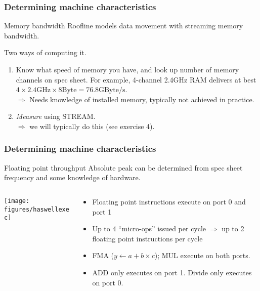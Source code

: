 \documentclass[presentation,aspectratio=43,10pt]{beamer}
\begin{document}
\begin{frame}
  \frametitle{Determining machine characteristics}
  \begin{exampleblock}{Memory bandwidth}
    Roofline models data movement with streaming memory bandwidth.

    Two ways of computing it.
    \begin{enumerate}
    \item Know what speed of memory you have, and look up number of
      memory channels on spec sheet. For example, 4-channel 2.4GHz
      RAM delivers at best $4 \times 2.4\text{GHz} \times 8\text{Byte}
      = 76.8\text{GByte/s}$.\\
      $\Rightarrow$ Needs knowledge of installed memory,
      typically not achieved in practice. 
    \item \emph{Measure} using STREAM.\\
      $\Rightarrow$ we will typically do this (see exercise 4).
    \end{enumerate}
  \end{exampleblock}
\end{frame}

\begin{frame}
  \frametitle{Determining machine characteristics}
  \begin{exampleblock}{Floating point throughput}
    Absolute peak can be determined from spec sheet frequency and some
    knowledge of hardware.

    \begin{columns}
      \begin{column}{0.35\textwidth}
        \begin{center}
          \texttt{[image: figures/haswellexec]}
        \end{center}
      \end{column}
      \begin{column}{0.55\textwidth}
        \begin{itemize}
        \item Floating point instructions execute on port 0 and port 1
        \item Up to 4 ``micro-ops'' issued per cycle $\Rightarrow$ up
          to 2 floating point instructions per cycle
        \item FMA ($y \gets a + b\times c$); MUL execute on
          both ports.
        \item ADD only executes on port 1. Divide only executes on
          port 0.
        \end{itemize}
      \end{column}
    \end{columns}
  \end{exampleblock}
\end{frame}
\end{document}

